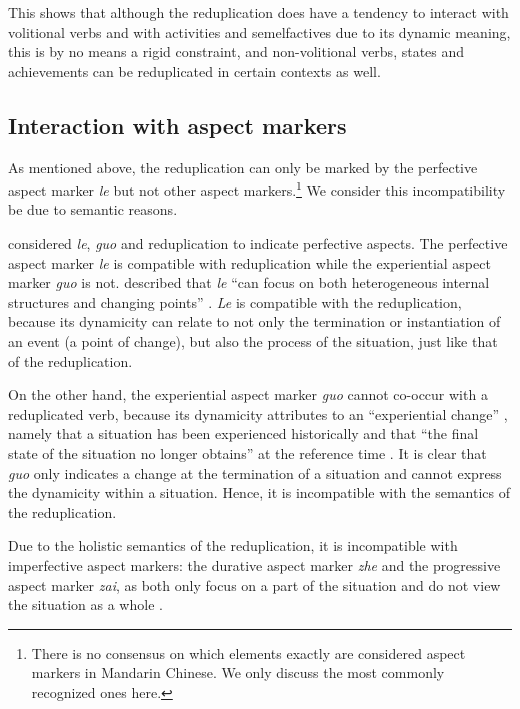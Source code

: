 \documentclass[11pt,a4paper,fleqn,draft]{article}
\begin{document}
This shows that although the reduplication does have a tendency to interact with volitional verbs and with activities and semelfactives due to its dynamic meaning, 
this is by no means a rigid constraint, 
and non\hyp{}volitional verbs, states and achievements can be reduplicated in certain contexts as well.




\subsection{Interaction with aspect markers}\label{sec:aspM}

As mentioned above, the reduplication can only be marked by the perfective aspect marker \emph{le} but not other aspect markers.\footnote{
There is no consensus on which elements exactly are considered aspect markers in Mandarin Chinese. We only discuss the most commonly recognized ones here.
}
We consider this incompatibility be due to semantic reasons.

\citet[Ch. 4]{XiaoMcEnery2004} considered \emph{le}, \emph{guo} and reduplication to indicate perfective aspects.
The perfective aspect marker \emph{le} is compatible with reduplication while the experiential aspect marker \emph{guo} is not.
\citet[128--131]{XiaoMcEnery2004} described that \emph{le} ``can focus on both heterogeneous internal structures and changing points'' \citep[129]{XiaoMcEnery2004}.
\emph{Le} is compatible with the reduplication, because its dynamicity can relate to not only the termination or instantiation of an event (a point of change), but also the process of the situation, just like that of the reduplication.

On the other hand, the experiential aspect marker \emph{guo} cannot co\hyp{}occur with a reduplicated verb, 
because its dynamicity attributes to an ``experiential change'' \citep[148]{XiaoMcEnery2004}, 
namely that a situation has been experienced historically and that ``the final state of the situation no longer obtains'' at the reference time \citep[144]{XiaoMcEnery2004}. 
It is clear that \emph{guo} only indicates a change at the termination of a situation and cannot express the dynamicity within a situation.
Hence, it is incompatible with the semantics of the reduplication.

Due to the holistic semantics of the reduplication, it is incompatible with imperfective aspect markers: the durative aspect marker \emph{zhe} and the progressive aspect marker \emph{zai}, as both only focus on  a part of the situation and do not view the situation as a whole \citep[Ch. 5]{XiaoMcEnery2004}.
\end{document}
